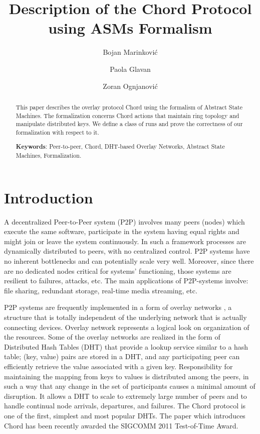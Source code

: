 \documentclass{amsart}
\title{Description of the Chord Protocol using ASMs Formalism}
\author{Bojan Marinkovi\'{c}}
\author{Paola Glavan}
\author{Zoran Ognjanovi\'{c}}
\theoremstyle{definition}
\begin{document}
\maketitle


\begin{abstract}
This paper describes the overlay protocol Chord using the
formalism of Abstract State Machines. The formalization concerns
Chord actions that maintain ring topology and manipulate
distributed keys. We define a class of runs and prove the
correctness of our formalization with respect to it.


\textbf{Keywords}: Peer-to-peer, Chord, DHT-based Overlay Networks, Abstract State Machines, Formalization.
\end{abstract}

\section{Introduction}

A decentralized Peer-to-Peer system (P2P) \cite{P2P2010} involves many peers (nodes) which execute the same software, participate in the system
having equal rights and might join or leave the system continuously. In such a framework processes are dynamically distributed to
peers, with no centralized control. P2P systems have no inherent bottlenecks and can potentially scale very well. Moreover, since
there are no dedicated nodes critical for systems' functioning, those systems are resilient to failures, attacks, etc. The main
applications of P2P-systems involve: file sharing, redundant storage, real-time media streaming, etc.

P2P systems are frequently implemented in a form of overlay networks \cite{p2p-book}, a structure that is totally independent of
the underlying network that is actually connecting devices. Overlay network represents a logical look on organization of the
resources.
Some of the overlay networks are realized in the form of Distributed Hash Tables (DHT) that provide a lookup service similar to a hash
table; (key, value) pairs are stored in a DHT, and any participating peer can efficiently retrieve the value associated with a given
key. Responsibility for maintaining the mapping from keys to values is distributed among the peers, in such a way that any change in
the set of participants causes a minimal amount of disruption. It allows a DHT to scale to extremely large number of peers and to
handle continual node arrivals, departures, and failures.
The Chord protocol \cite{Chord,Chord-TR,Chord-IEEE} is one of the first, simplest and most popular DHTs.
The paper \cite{Chord} which introduces Chord has been recently awarded the SIGCOMM 2011 Test-of-Time Award.
\end{document}
